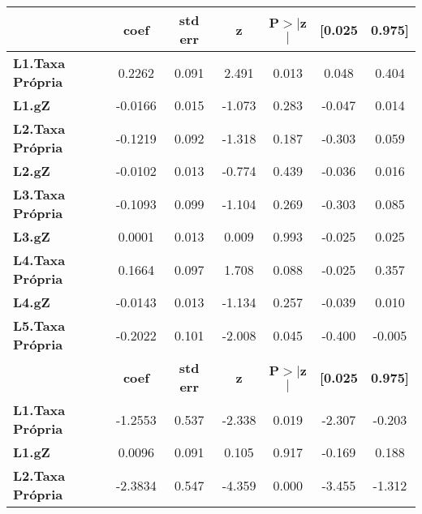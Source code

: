 \begin{center}
\begin{tabular}{lcccccc}
\toprule
                         & \textbf{coef} & \textbf{std err} & \textbf{z} & \textbf{P$> |$z$|$} & \textbf{[0.025} & \textbf{0.975]}  \\
\midrule
\textbf{L1.Taxa Própria} &       0.2262  &        0.091     &     2.491  &         0.013        &        0.048    &        0.404     \\
\textbf{L1.gZ}           &      -0.0166  &        0.015     &    -1.073  &         0.283        &       -0.047    &        0.014     \\
\textbf{L2.Taxa Própria} &      -0.1219  &        0.092     &    -1.318  &         0.187        &       -0.303    &        0.059     \\
\textbf{L2.gZ}           &      -0.0102  &        0.013     &    -0.774  &         0.439        &       -0.036    &        0.016     \\
\textbf{L3.Taxa Própria} &      -0.1093  &        0.099     &    -1.104  &         0.269        &       -0.303    &        0.085     \\
\textbf{L3.gZ}           &       0.0001  &        0.013     &     0.009  &         0.993        &       -0.025    &        0.025     \\
\textbf{L4.Taxa Própria} &       0.1664  &        0.097     &     1.708  &         0.088        &       -0.025    &        0.357     \\
\textbf{L4.gZ}           &      -0.0143  &        0.013     &    -1.134  &         0.257        &       -0.039    &        0.010     \\
\textbf{L5.Taxa Própria} &      -0.2022  &        0.101     &    -2.008  &         0.045        &       -0.400    &       -0.005     \\
                         & \textbf{coef} & \textbf{std err} & \textbf{z} & \textbf{P$> |$z$|$} & \textbf{[0.025} & \textbf{0.975]}  \\
\midrule
\textbf{L1.Taxa Própria} &      -1.2553  &        0.537     &    -2.338  &         0.019        &       -2.307    &       -0.203     \\
\textbf{L1.gZ}           &       0.0096  &        0.091     &     0.105  &         0.917        &       -0.169    &        0.188     \\
\textbf{L2.Taxa Própria} &      -2.3834  &        0.547     &    -4.359  &         0.000        &       -3.455    &       -1.312     \\

\end{tabular}
\end{center}
